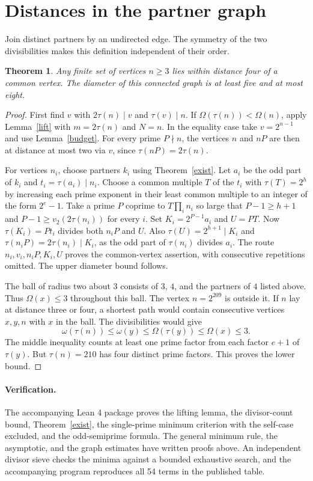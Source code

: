 \documentclass[11pt]{article}
\newtheorem{theorem}{Theorem}[section]
\begin{document}
\clearpage
\section{Distances in the partner graph}
Join distinct partners by an undirected edge. The symmetry of the two divisibilities makes this definition independent of their order.
\begin{theorem}
Any finite set of vertices $n\ge3$ lies within distance four of a common vertex. The diameter of this connected graph is at least five and at most eight.
\end{theorem}
\begin{proof}
First find $v$ with $2\tau(n)\mid v$ and $\tau(v)\mid n$. If $\Omega(\tau(n))<\Omega(n)$, apply Lemma~\ref{lift} with $m=2\tau(n)$ and $N=n$. In the equality case take $v=2^{n-1}$ and use Lemma~\ref{budget}. For every prime $P\nmid n$, the vertices $n$ and $nP$ are then at distance at most two via $v$, since $\tau(nP)=2\tau(n)$.

For vertices $n_i$, choose partners $k_i$ using Theorem~\ref{exist}. Let $a_i$ be the odd part of $k_i$ and $t_i=\tau(a_i)\mid n_i$. Choose a common multiple $T$ of the $t_i$ with $\tau(T)=2^h$ by increasing each prime exponent in their least common multiple to an integer of the form $2^e-1$. Take a prime $P$ coprime to $T\prod_i n_i$ so large that $P-1\ge h+1$ and $P-1\ge v_2(2\tau(n_i))$ for every $i$. Set $K_i=2^{P-1}a_i$ and $U=PT$. Now $\tau(K_i)=Pt_i$ divides both $n_iP$ and $U$. Also $\tau(U)=2^{h+1}\mid K_i$ and $\tau(n_iP)=2\tau(n_i)\mid K_i$, as the odd part of $\tau(n_i)$ divides $a_i$. The route $n_i,v_i,n_iP,K_i,U$ proves the common-vertex assertion, with consecutive repetitions omitted. The upper diameter bound follows.

The ball of radius two about $3$ consists of $3$, $4$, and the partners of $4$ listed above. Thus $\Omega(x)\le3$ throughout this ball. The vertex $n=2^{209}$ is outside it. If $n$ lay at distance three or four, a shortest path would contain consecutive vertices $x,y,n$ with $x$ in the ball. The divisibilities would give
\[
 \omega(\tau(n))\le\omega(y)\le\Omega(\tau(y))\le\Omega(x)\le3.
\]
The middle inequality counts at least one prime factor from each factor $e+1$ of $\tau(y)$. But $\tau(n)=210$ has four distinct prime factors. This proves the lower bound.
\end{proof}

\paragraph{Verification.}
The accompanying Lean 4 package proves the lifting lemma, the divisor-count bound, Theorem~\ref{exist}, the single-prime minimum criterion with the self-case excluded, and the odd-semiprime formula. The general minimum rule, the asymptotic, and the graph estimates have written proofs above. An independent divisor sieve checks the minima against a bounded exhaustive search, and the accompanying program reproduces all 54 terms in the published table.
\end{document}
